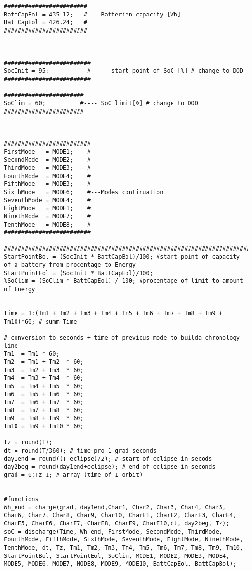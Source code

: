 \begin{appendix}
\begin{lstlisting}
########################
BattCapBol = 435.12;   # ---Batterien capacity [Wh]
BattCapEol = 426.24;   #
########################



#########################
SocInit = 95;           # ---- start point of SoC [%] # change to DOD
#########################

#######################
SoClim = 60;          #---- SoC limit[%] # change to DOD
#######################



#########################
FirstMode   = MODE1;    #
SecondMode  = MODE2;    #
ThirdMode   = MODE3;    #
FourthMode  = MODE4;    #
FifthMode   = MODE3;    #
SixthMode   = MODE6;    #---Modes continuation
SeventhMode = MODE4;    #
EightMode   = MODE1;    #
NinethMode  = MODE7;    #
TenthMode   = MODE8;    #
#########################

########################################################################################
StartPointBol = (SocInit * BattCapBol)/100; #start point of capacity of a battery from procentage to Energy
StartPointEol = (SocInit * BattCapEol)/100;
%SoClim = (SoClim * BattCapEol) / 100; #procentage of limit to amount of Energy


Time = 1:(Tm1 + Tm2 + Tm3 + Tm4 + Tm5 + Tm6 + Tm7 + Tm8 + Tm9 + Tm10)*60; # summ Time 

# conversion to seconds + time of previous mode to builda chronology line
Tm1  = Tm1 * 60;  
Tm2  = Tm1 + Tm2  * 60; 
Tm3  = Tm2 + Tm3  * 60;
Tm4  = Tm3 + Tm4  * 60;
Tm5  = Tm4 + Tm5  * 60;
Tm6  = Tm5 + Tm6  * 60;
Tm7  = Tm6 + Tm7  * 60;
Tm8  = Tm7 + Tm8  * 60;
Tm9  = Tm8 + Tm9  * 60;
Tm10 = Tm9 + Tm10 * 60;

Tz = round(T); 
dt = round(T/360); # time pro 1 grad seconds
day1end = round((T-eclipse)/2); # start of eclipse in secods
day2beg = round(day1end+eclipse); # end of eclipse in seconds
grad = 0:Tz-1; # array (time of 1 orbit) 


#functions
Wh_end = charge(grad, day1end,Char1, Char2, Char3, Char4, Char5, Char6, Char7, Char8, Char9, Char10, CharE1, CharE2, CharE3, CharE4, CharE5, CharE6, CharE7, CharE8, CharE9, CharE10,dt, day2beg, Tz);
soC = discharge(Time, Wh_end, FirstMode, SecondMode, ThirdMode, FourthMode, FifthMode, SixthMode, SeventhMode, EightMode, NinethMode, TenthMode, dt, Tz, Tm1, Tm2, Tm3, Tm4, Tm5, Tm6, Tm7, Tm8, Tm9, Tm10, StartPointBol, StartPointEol, SoClim, MODE1, MODE2, MODE3, MODE4, MODE5, MODE6, MODE7, MODE8, MODE9, MODE10, BattCapEol, BattCapBol);      




\end{lstlisting}
\end{appendix}
